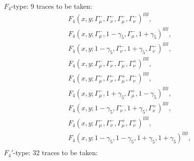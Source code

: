 $F_4$-type: 9 traces to be taken:
\begin{align*}
&F_4(x,y;\Gamma_\mu^-,\Gamma_\nu^-,\Gamma_\mu^-,\Gamma_\nu^-)^{llll},\\
&F_4(x,y;\Gamma_\mu^-,1-\gamma_5,\Gamma_\mu^-,1+\gamma_5)^{llll},\\
&F_4(x,y;1-\gamma_5,\Gamma_\nu^-,1+\gamma_5,\Gamma_\nu^-)^{llll},\\
&F_4(x,y;\Gamma_\mu^-,\Gamma_\nu^-,\Gamma_\mu^-,\Gamma_\nu^+)^{llll},\\
&F_4(x,y;\Gamma_\mu^-,\Gamma_\nu^-,\Gamma_\mu^+,\Gamma_\nu^-)^{llll},\\
&F_4(x,y;\Gamma_\mu^-,1+\gamma_5,\Gamma_\mu^+,1-\gamma_5)^{llll},\\
&F_4(x,y;1-\gamma_5,\Gamma_\nu^-,1+\gamma_5,\Gamma_\nu^+)^{llll},\\
&F_4(x,y;\Gamma_\mu^-,\Gamma_\nu^-,\Gamma_\mu^+,\Gamma_\nu^+)^{llll},\\
&F_4(x,y;1-\gamma_5,1-\gamma_5,1+\gamma_5,1+\gamma_5)^{llll},\\
\end{align*}
$F_4'$-type: 32 traces to be taken:
